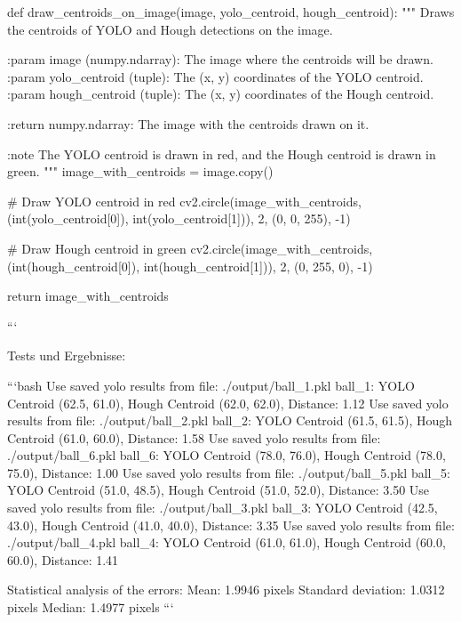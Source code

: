 def draw_centroids_on_image(image, yolo_centroid, hough_centroid):
    """
    Draws the centroids of YOLO and Hough detections on the image.

    :param image (numpy.ndarray): The image where the centroids will be drawn.
    :param yolo_centroid (tuple): The (x, y) coordinates of the YOLO centroid.
    :param hough_centroid (tuple): The (x, y) coordinates of the Hough centroid.

    :return numpy.ndarray: The image with the centroids drawn on it.

    :note The YOLO centroid is drawn in red, and the Hough centroid is drawn in green.
    """
    image_with_centroids = image.copy()

    # Draw YOLO centroid in red
    cv2.circle(image_with_centroids, (int(yolo_centroid[0]), int(yolo_centroid[1])), 2, (0, 0, 255), -1)

    # Draw Hough centroid in green
    cv2.circle(image_with_centroids, (int(hough_centroid[0]), int(hough_centroid[1])), 2, (0, 255, 0), -1)

    return image_with_centroids


```


Tests und Ergebnisse:

```bash
Use saved yolo results from file: ./output/ball_1.pkl
ball_1: YOLO Centroid (62.5, 61.0), Hough Centroid (62.0, 62.0), Distance: 1.12
Use saved yolo results from file: ./output/ball_2.pkl
ball_2: YOLO Centroid (61.5, 61.5), Hough Centroid (61.0, 60.0), Distance: 1.58
Use saved yolo results from file: ./output/ball_6.pkl
ball_6: YOLO Centroid (78.0, 76.0), Hough Centroid (78.0, 75.0), Distance: 1.00
Use saved yolo results from file: ./output/ball_5.pkl
ball_5: YOLO Centroid (51.0, 48.5), Hough Centroid (51.0, 52.0), Distance: 3.50
Use saved yolo results from file: ./output/ball_3.pkl
ball_3: YOLO Centroid (42.5, 43.0), Hough Centroid (41.0, 40.0), Distance: 3.35
Use saved yolo results from file: ./output/ball_4.pkl
ball_4: YOLO Centroid (61.0, 61.0), Hough Centroid (60.0, 60.0), Distance: 1.41

Statistical analysis of the errors:
Mean: 1.9946 pixels
Standard deviation: 1.0312 pixels
Median: 1.4977 pixels
```